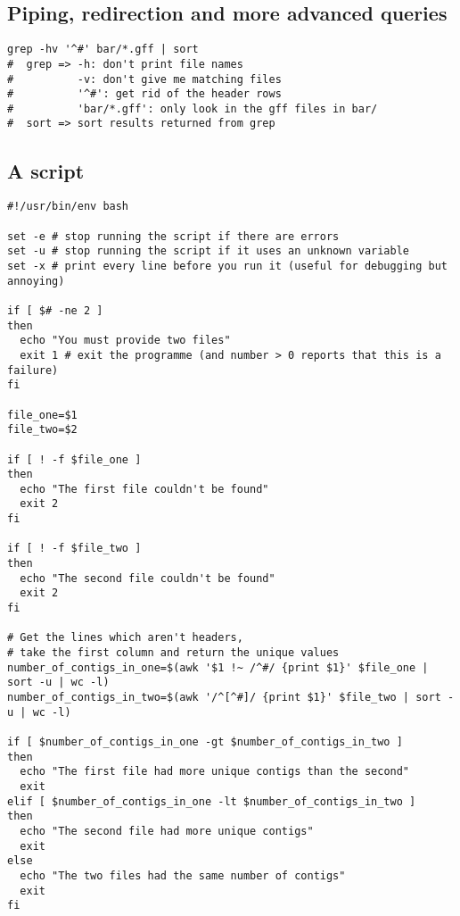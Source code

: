 \documentclass[11pt]{article}
\begin{document}
\hypertarget{piping-redirection-and-more-advanced-queries}{%
\subsection{Piping, redirection and more advanced
queries}\label{piping-redirection-and-more-advanced-queries}}

\begin{verbatim}
grep -hv '^#' bar/*.gff | sort
#  grep => -h: don't print file names
#          -v: don't give me matching files
#          '^#': get rid of the header rows
#          'bar/*.gff': only look in the gff files in bar/
#  sort => sort results returned from grep
\end{verbatim}

\hypertarget{a-script}{%
\subsection{A script}\label{a-script}}

\begin{verbatim}
#!/usr/bin/env bash

set -e # stop running the script if there are errors
set -u # stop running the script if it uses an unknown variable
set -x # print every line before you run it (useful for debugging but annoying)

if [ $# -ne 2 ]
then
  echo "You must provide two files"
  exit 1 # exit the programme (and number > 0 reports that this is a failure)
fi

file_one=$1
file_two=$2

if [ ! -f $file_one ]
then
  echo "The first file couldn't be found"
  exit 2
fi

if [ ! -f $file_two ]
then
  echo "The second file couldn't be found"
  exit 2
fi

# Get the lines which aren't headers,
# take the first column and return the unique values
number_of_contigs_in_one=$(awk '$1 !~ /^#/ {print $1}' $file_one | sort -u | wc -l)
number_of_contigs_in_two=$(awk '/^[^#]/ {print $1}' $file_two | sort -u | wc -l)

if [ $number_of_contigs_in_one -gt $number_of_contigs_in_two ]
then
  echo "The first file had more unique contigs than the second"
  exit
elif [ $number_of_contigs_in_one -lt $number_of_contigs_in_two ]
then
  echo "The second file had more unique contigs"
  exit
else
  echo "The two files had the same number of contigs"
  exit
fi
\end{verbatim}
\end{document}
